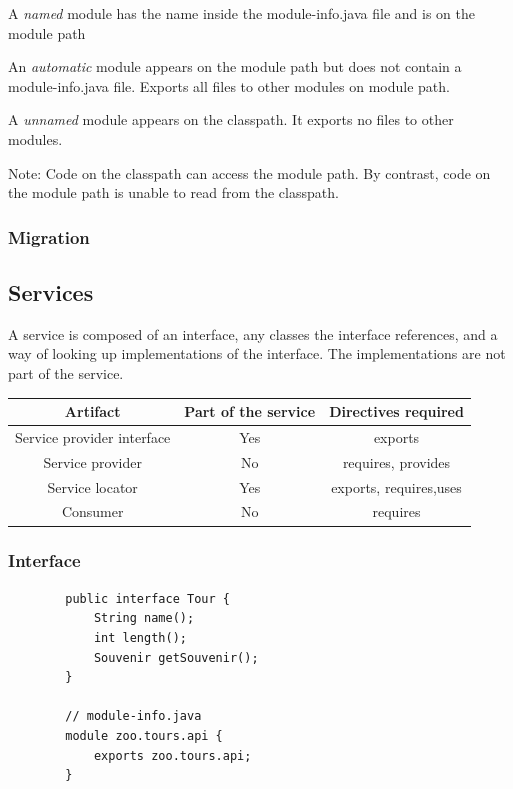 \documentclass{scrartcl}
\begin{document}
    A \textit{named} module has the name inside the module-­info.java file and is on the module path

    An \textit{automatic} module appears on the module path but does not contain a module-­info.java
    file. Exports all files to other modules on module path.

    A \textit{unnamed} module appears on the classpath. It exports no files to other modules.

    Note: Code on the classpath can access the module path. By contrast, code on the module path is unable to read from the classpath.

\subsubsection{Migration}

\subsection{Services}

    A service is composed of an interface, any classes the interface references, and a way of looking up implementations of the interface.
    The implementations are not part of the service.

    \begin{tabular}{|c|c|c|}
        \hline
        Artifact& Part of the service &  Directives required\\
        \hline
        Service provider interface& Yes & exports \\
        \hline
        Service provider& No & requires, provides \\
        \hline
        Service locator	&Yes  & exports, requires,uses \\
        \hline
        Consumer& No &  requires\\
        \hline
    \end{tabular}

\subsubsection{Interface}

    \begin{lstlisting}
        public interface Tour {
            String name();
            int length();
            Souvenir getSouvenir();
        }

        // module-info.java
        module zoo.tours.api {
            exports zoo.tours.api;
        }

    \end{lstlisting}
\end{document}
